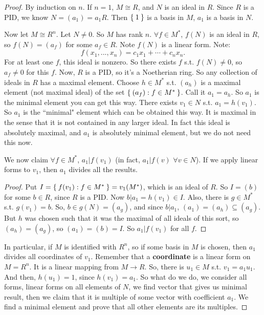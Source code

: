 \documentclass[12pt]{amsbook}
\theoremstyle{plain}
\numberwithin{section}{chapter}
\numberwithin{equation}{chapter}
\theoremstyle{definition}
\theoremstyle{remark}
\newcommand{\sub}{\subseteq}
\begin{document}
\begin{proof}
By induction on $n$. If $n = 1$, $M \cong R$, and $N$ is an ideal in $R$. Since $R$ is a PID, we know $N = (a_1) = a_1R$. Then $\Set{1}$ is a basis in $M$, $a_1$ is a basis in $N$. 

Now let $M \cong R^n$. Let $N \neq 0$. So $M$ has rank $n$. $\forall f\in M^*$, $f(N)$ is an ideal in $R$, so $f(N) = (a_f)$ for some $a_f \in R$. Note $f(N)$ is a linear form. Note:
$$
f(x_1,...,x_n) = c_1x_1 + \cdots + c_nx_n.
$$
For at least one $f$, this ideal is nonzero. So there exists $f$ s.t. $f(N) \neq 0$, so $a_f \neq 0$ for this $f$. Now, $R$ is a PID, so it's a Noetherian ring. So any collection of ideals in $R$ has a maximal element. Choose $h \in M^*$ s.t. $(a_h)$ is a maximal element (not maximal ideal) of the set $\Set{(a_f):f \in M^*}$. Call it $a_1 = a_h$. So $a_1$ is the minimal element you can get this way. There exists $v_1 \in N$ s.t. $a_1 = h(v_1)$. So $a_1$ is the ``minimal" element which can be obtained this way. It is maximal in the sense that it is not contained in any larger ideal. In fact this ideal is absolutely maximal, and $a_1$ is absolutely minimal element, but we do not need this now. 

We now claim $\forall f \in M^*$, $a_1|f(v_1)$ (in fact, $a_1|f(v)$ $\forall v \in N$). If we apply linear forms to $v_1$, then $a_1$ divides all the results. 
\begin{proof}
Put $I = \Set{f(v_1):f \in M^*} = v_1(M^*)$, which is an ideal of $R$. So $I = (b)$ for some $b \in R$, since $R$ is a PID. Now $b|a_1 = h(v_1) \in I$. Also, there is $g \in M^*$ s.t. $g(v_1) = b$. So, $b \in g(N) = (a_g)$, and since $b|a_1$, $(a_1) = (a_h) \sub (a_g)$. But $h$ was chosen such that it was the maximal of all ideals of this sort, so $(a_h) = (a_g)$, so $(a_1) = (b) = I$. So $a_1|f(v_1)$ for all $f$. 
\end{proof}

In particular, if $M$ is identified with $R^n$, so if some basis in $M$ is chosen, then $a_1$ divides all coordinates of $v_1$. Remember that a \textbf{coordinate} is a linear form on $M = R^n$. It is a linear mapping from $M \to R$. So, there is $u_1 \in M$ s.t. $v_1 = a_1u_1$. And then, $h(u_1) = 1$, since $h(v_1) = a_1$. So what do we do, we consider all forms, linear forms on all elements of $N$, we find vector that gives us minimal result, then we claim that it is multiple of some vector with coefficient $a_1$. We find a minimal element and prove that all other elements are its multiples. 


\end{proof}
\end{document}
